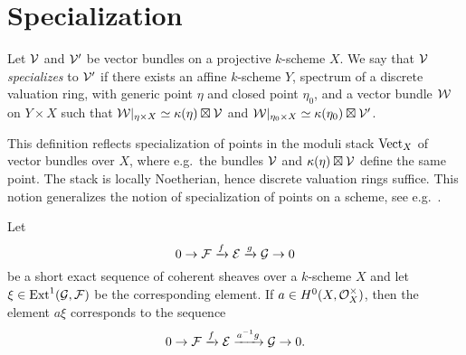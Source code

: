 \section{Specialization}

\begin{definition}
	Let $\mathcal{V}$ and $\mathcal{V'}$ be vector bundles on a projective $k$-scheme $X$. We say that $\mathcal{V}$ \emph{specializes} to $\mathcal{V'}$ if there exists an affine $k$-scheme $Y$, spectrum of a discrete valuation ring, with generic point $\eta$ and closed point $\eta_0$, and a vector bundle $\mathcal{W}$ on
	$Y\times X$
	such that
	$\mathcal{W}|_{\eta \times X} \simeq \kappa(\eta)\boxtimes\mathcal{V}$
	and
	$\mathcal{W}|_{\eta_0 \times X} \simeq \kappa(\eta_0)\boxtimes\mathcal{V'}$. 
\end{definition}

\begin{remark}
	This definition reflects specialization of points in the moduli stack $\mathrm{Vect}_X$ of vector bundles over $X$, where e.g.\ the bundles $\mathcal{V}$ and $\kappa(\eta) \boxtimes \mathcal{V}$ define the same point. The stack is locally Noetherian, hence discrete valuation rings suffice. This notion generalizes the notion of specialization of points on a scheme, see e.g.\ \cite[Prop.\ 7.1.9]{egaii}.
\end{remark}

\begin{remark} \label{rem:scalars-on-ext} Let
	\[ 0 \to \mathcal{F} \xrightarrow{f} \mathcal{E} \xrightarrow{g} \mathcal{G} \to 0 \]
	be a short exact sequence of coherent sheaves over a $k$-scheme $X$ and let $\xi \in \operatorname{Ext}^1(\mathcal{G},\mathcal{F})$ be the corresponding element. If $a \in H^0(X,\mathcal{O}^{\times}_X)$, then the element $a\xi$ corresponds to the sequence
	\[ 0 \to \mathcal{F} \xrightarrow{f} \mathcal{E} \xrightarrow{a^{-1}g} \mathcal{G} \to 0.\]
\end{remark}


